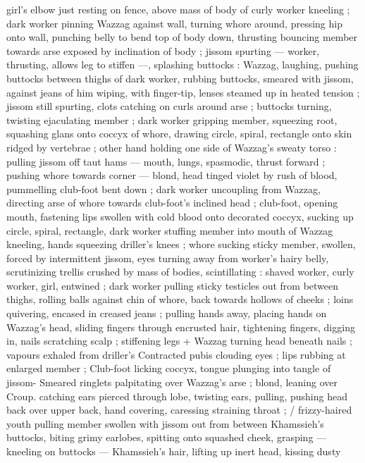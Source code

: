 girl's elbow just resting on fence, above mass of body of curly 
worker kneeling ; dark worker pinning Wazzag against wall, turning 
whore around, pressing hip onto wall, punching belly to bend top of 
body down, thrusting bouncing member towards arse exposed by 
inclination of body ; jissom spurting --- worker, thrusting, allows leg 
to stiffen ---, splashing buttocks : Wazzag, laughing, pushing 
buttocks between thighs of dark worker, rubbing buttocks, smeared 
with jissom, against jeans of him wiping, with finger-tip, lenses 
steamed up in heated tension ; jissom still spurting, clots catching on 
curls around arse ; buttocks turning, twisting ejaculating member ; 
dark worker gripping member, squeezing root, squashing glans onto 
coccyx of whore, drawing circle, spiral, rectangle onto skin ridged by 
vertebrae ; other hand holding one side of Wazzag's sweaty torso : 
pulling jissom off taut hams --- mouth, lungs, spasmodic, thrust 
forward ; pushing whore towards corner --- blond, head tinged violet 
by rush of blood, pummelling club-foot bent down ; dark worker 
uncoupling from Wazzag, directing arse of whore towards club-foot's 
inclined head ; club-foot, opening mouth, fastening lips swollen with 
cold blood onto decorated coccyx, sucking up circle, spiral, 
rectangle, dark worker stuffing member into mouth of Wazzag 
kneeling, hands squeezing driller's knees ; whore sucking sticky 
member, swollen, forced by intermittent jissom, eyes turning away 
from worker's hairy belly, scrutinizing trellis crushed by mass of 
bodies, scintillating : shaved worker, curly worker, girl, entwined ; 
dark worker pulling sticky testicles out from between thighs, rolling 
balls against chin of whore, back towards hollows of cheeks ; loins 
quivering, encased in creased jeans ; pulling hands away, placing 
hands on Wazzag's head, sliding fingers through encrusted hair, 
tightening fingers, digging in, nails scratching scalp ; stiffening legs 
+ Wazzag turning head beneath nails ; vapours exhaled from driller's 
Contracted pubis clouding eyes ; lips rubbing at enlarged member ; 
Club-foot licking coccyx, tongue plunging into tangle of jissom- 
Smeared ringlets palpitating over Wazzag's arse ; blond, leaning over 
Croup. catching ears pierced through lobe, twisting ears, pulling, 
pushing head back over upper back, hand covering, caressing 
straining throat ; {\slash} frizzy-haired youth pulling member swollen with 
jissom out from between Khamssieh's buttocks, biting grimy 
earlobes, spitting onto squashed cheek, grasping --- kneeling on 
buttocks --- Khamssieh's hair, lifting up inert head, kissing dusty 
